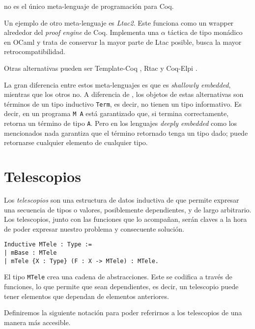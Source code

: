 \Mtac no es el único meta-lenguaje de programación para Coq. 

Un ejemplo de otro meta-lenguaje es \emph{Ltac2}.
Este funciona como un wrapper alrededor del \emph{proof engine} de Coq.
Implementa una $\alpha$ táctica de tipo monádico en OCaml y trata de conservar la mayor parte de Ltac posible, busca la mayor retrocompatibilidad.

Otras alternativas pueden ser Template-Coq \cite{DBLP:conf/itp/AnandBCST18}, Rtac \cite{DBLP:conf/esop/MalechaB16} y Coq-Elpi \cite{tassi:hal-01637063}.

La gran diferencia entre estos meta-lenguajes es que \Mtac es \emph{shallowly embedded}, mientras que los otros no. A diferencia de \Mtac, los objetos de estas alternativas son términos de un tipo inductivo \lstinline{Term}, es decir, no tienen un tipo informativo. Es decir, en \Mtac un programa \lstinline{M A} está garantizado que, si termina correctamente, retorna un término de tipo \lstinline{A}. Pero en los lenguajes \emph{deeply embedded} como los mencionados nada garantiza que el término retornado tenga un tipo dado; puede retornarse cualquier elemento de cualquier tipo.

\section{Telescopios}

Los \emph{telescopios} son una estructura de datos inductiva de \Mtac que permite expresar una secuencia de tipos o valores, posiblemente dependientes, y de largo arbitrario.
Los telescopios, junto con las funciones que lo acompañan, serán claves a la hora de poder expresar nuestro problema y consecuente solución.

\begin{lstlisting}[frame=tb,caption={Definicion de telescopio},label=lst:MTele]
Inductive MTele : Type :=
| mBase : MTele
| mTele {X : Type} (F : X -> MTele) : MTele.
\end{lstlisting}

El tipo \lstinline{MTele} crea una cadena de abstracciones.
Este se codifica a través de funciones, lo que permite que sean dependientes, es decir, un telescopio puede tener elementos que dependan de elementos anteriores.

Definiremos la siguiente notación para poder referirnos a los telescopios de una manera más accesible.

